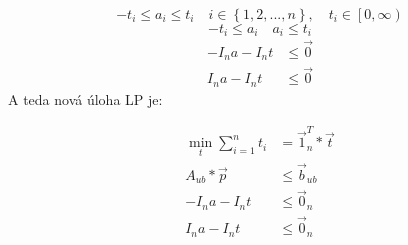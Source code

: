 \documentclass{article}
\begin{document}
\[-t_i \leq a_i \leq t_i \quad i \in \left\{ 1, 2, ..., n\right\}, \quad t_i \in \left[0,\infty\right)\]
\[-t_i \leq a_i \quad a_i \leq t_i\]
\begin{align*}
-I_n a - I_n t &\leq \Vec{0}\\
I_n a - I_n t &\leq \Vec{0}
\end{align*}
\newline\newline\newline\newline
A teda nová úloha LP je:

\begin{align*}
\min_t \sum_{i=1}^{n}{t_i} &= \Vec{1}_n^T * \Vec{t}\\
A_{ub} * \Vec{p} &\leq \Vec{b}_{ub}\\
-I_n a - I_n t &\leq \Vec{0}_n\\
I_na - I_nt &\leq \Vec{0}_n\\ 
\end{align*}
\end{document}
